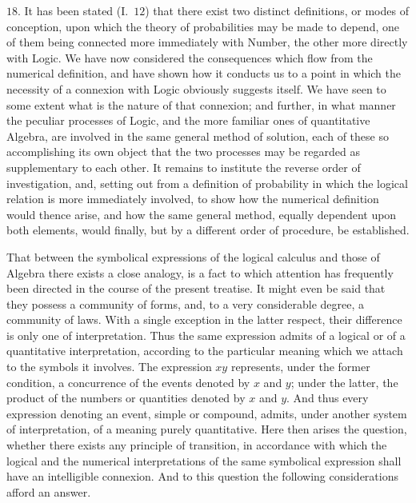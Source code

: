 \documentclass[oneside]{book}
\begin{document}
$18$. It has been stated (I.~$12$) that there exist two distinct definitions,
or modes of conception, upon which the theory of probabilities
may be made to depend, one of them being connected
more immediately with Number, the other more directly with
Logic. We have now considered the consequences which flow
from the numerical definition, and have shown how it conducts
us to a point in which the necessity of a connexion with Logic
obviously suggests itself. We have seen to some extent what
is the nature of that connexion; and further, in what manner the
peculiar processes of Logic, and the more familiar ones of quantitative
Algebra, are involved in the same general method of solution,
each of these so accomplishing its own object that the two
processes may be regarded as supplementary to each other. It
remains to institute the reverse order of investigation, and, setting
out from a definition of probability in which the logical relation
is more immediately involved, to show how the numerical definition
would thence arise, and how the same general method,
equally dependent upon both elements, would finally, but by a
different order of procedure, be established.

That between the symbolical expressions of the logical calculus
and those of Algebra there exists a close analogy, is a fact
to which attention has frequently been directed in the course of
the present treatise. It might even be said that they possess a
community of forms, and, to a very considerable degree, a community
of laws. With a single exception in the latter respect,
their difference is only one of interpretation. Thus the same
expression admits of a logical or of a quantitative interpretation,
according to the particular meaning which we attach to the
symbols it involves. The expression $xy$ represents, under the former
condition, a concurrence of the events denoted by $x$ and $y$; under
the latter, the product of the numbers or quantities denoted by $x$
and $y$. And thus every expression denoting an event, simple or
compound, admits, under another system of interpretation, of a
meaning purely quantitative. Here then arises the question,
whether there exists any principle of transition, in accordance
with which the logical and the numerical interpretations of the
same symbolical expression shall have an intelligible connexion.
And to this question the following considerations afford an
answer.
\end{document}
